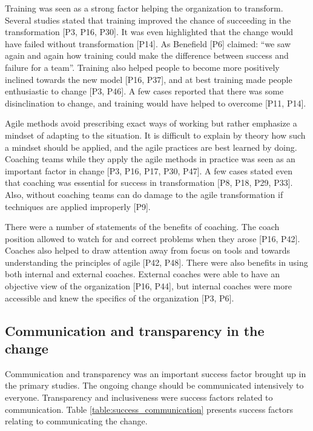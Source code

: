 Training was seen as a strong factor helping the organization to transform.
Several studies stated that training improved the chance of succeeding in the
transformation [P3, P16, P30]. It was even highlighted that the change would have
failed without transformation [P14]. As Benefield [P6] claimed: ``we saw again
and again how training could make the difference between success and failure for
a team''. Training also helped people to become more positively inclined towards
the new model [P16, P37], and at best training made people enthusiastic to change
[P3, P46]. A few cases reported that there was some disinclination to change,
and training would have helped to overcome [P11, P14].

Agile methods avoid prescribing exact ways of working but rather emphasize a
mindset of adapting to the situation. It is difficult to explain by theory how
such a mindset should be applied, and the agile practices are best learned by
doing. Coaching teams while they apply the agile methods in practice was seen as
an important factor in change [P3, P16, P17, P30, P47]. A few cases stated even
that coaching was essential for success in transformation [P8, P18, P29, P33].
Also, without coaching teams can do damage to the agile transformation if
techniques are applied improperly [P9].

There were a number of statements of the benefits of coaching. The coach
position allowed to watch for and correct problems when they arose [P16, P42].
Coaches also helped to draw attention away from focus on tools and towards
understanding the principles of agile [P42, P48].
There were also benefits in using both internal and external coaches.
External coaches were able to have an objective view of the organization [P16,
P44], but internal coaches were more accessible and knew the specifics of the
organization [P3, P6].


\subsection{Communication and transparency in the change}

Communication and transparency was an important success factor brought up in the
primary studies. The ongoing change should be communicated intensively to
everyone. Transparency and inclusiveness were success factors related to
communication.
Table \ref{table:success_communication} presents success factors relating to
communicating the change.

